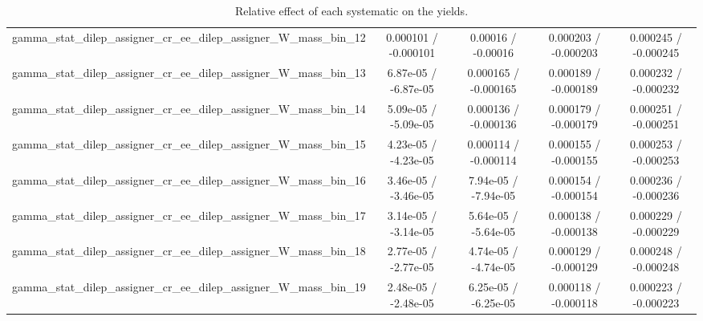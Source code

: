 \documentclass[10pt]{article}
\begin{document}
\begin{table}[htbp]
\begin{center}
\begin{tabular}{|c|c|c|c|c|}
  gamma_stat_dilep_assigner_cr_ee_dilep_assigner_W_mass_bin_12 & 0.000101 / -0.000101 & 0.00016 / -0.00016 & 0.000203 / -0.000203 & 0.000245 / -0.000245 \\ 
  gamma_stat_dilep_assigner_cr_ee_dilep_assigner_W_mass_bin_13 & 6.87e-05 / -6.87e-05 & 0.000165 / -0.000165 & 0.000189 / -0.000189 & 0.000232 / -0.000232 \\ 
  gamma_stat_dilep_assigner_cr_ee_dilep_assigner_W_mass_bin_14 & 5.09e-05 / -5.09e-05 & 0.000136 / -0.000136 & 0.000179 / -0.000179 & 0.000251 / -0.000251 \\ 
  gamma_stat_dilep_assigner_cr_ee_dilep_assigner_W_mass_bin_15 & 4.23e-05 / -4.23e-05 & 0.000114 / -0.000114 & 0.000155 / -0.000155 & 0.000253 / -0.000253 \\ 
  gamma_stat_dilep_assigner_cr_ee_dilep_assigner_W_mass_bin_16 & 3.46e-05 / -3.46e-05 & 7.94e-05 / -7.94e-05 & 0.000154 / -0.000154 & 0.000236 / -0.000236 \\ 
  gamma_stat_dilep_assigner_cr_ee_dilep_assigner_W_mass_bin_17 & 3.14e-05 / -3.14e-05 & 5.64e-05 / -5.64e-05 & 0.000138 / -0.000138 & 0.000229 / -0.000229 \\ 
  gamma_stat_dilep_assigner_cr_ee_dilep_assigner_W_mass_bin_18 & 2.77e-05 / -2.77e-05 & 4.74e-05 / -4.74e-05 & 0.000129 / -0.000129 & 0.000248 / -0.000248 \\ 
  gamma_stat_dilep_assigner_cr_ee_dilep_assigner_W_mass_bin_19 & 2.48e-05 / -2.48e-05 & 6.25e-05 / -6.25e-05 & 0.000118 / -0.000118 & 0.000223 / -0.000223 \\ 
\hline 
\end{tabular} 
\caption{Relative effect of each systematic on the yields.} 
\end{center} 
\end{table} 
\end{document}

